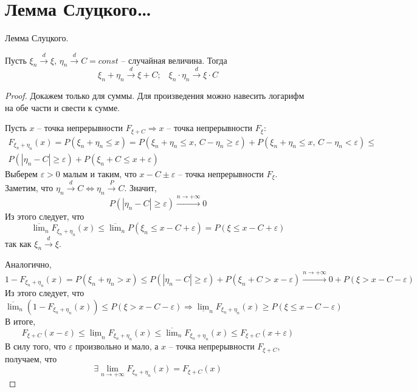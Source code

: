 \section{Лемма Слуцкого\dots}
\begin{theorem}
	Лемма Слуцкого.

	Пусть $\xi_n \stackrel{d}{\to} \xi,\, \eta_n \stackrel{d}{\to} C = const$ -- случайная величина. Тогда
	\[\xi_n + \eta_n \stackrel{d}{\to} \xi + C;\;\;\; \xi_n\cdot\eta_n \stackrel{d}{\to} \xi\cdot C\]
\end{theorem}

\begin{proof}
	Докажем только для суммы. Для произведения можно навесить логарифм на обе части и свести к сумме.

	Пусть $x$ -- точка непрерывности $F_{\xi + C} \Rightarrow x$ -- точка непрерывности $F_\xi$:
	\begin{align*}
		F_{\xi_n + \eta_n}(x) = P(\xi_n + \eta_n \leq x) = P(\xi_n + \eta_n \leq x,\, C - \eta_n \geq \varepsilon) + P(\xi_n + \eta_n \leq x,\, C - \eta_n < \varepsilon) \leq \\
		P(|\eta_n - C| \geq \varepsilon) + P(\xi_n + C \leq x + \varepsilon)
	\end{align*}
	Выберем $\varepsilon > 0$ малым и таким, что $x - C \pm \varepsilon$ -- точка непрерывности $F_\xi$. Заметим, что $\eta_n \stackrel{d}{\to} C \Leftrightarrow \eta_n \stackrel{P}{\to} C$. Значит,
	\[P(|\eta_n - C| \geq \varepsilon) \stackrel{n \to +\infty}{\to} 0\]
	Из этого следует, что
	\[\overline{\lim}_n F_{\xi_n + \eta_n}(x) \leq \overline{\lim}_n P(\xi_n \leq x - C + \varepsilon) = P(\xi \leq x - C + \varepsilon)\]
	так как $\xi_n \stackrel{d}{\to} \xi$.

	Аналогично,
	\[1 - F_{\xi_n + \eta_n}(x) = P(\xi_n + \eta_n > x) \leq P(|\eta_n - C| \geq \varepsilon) + P(\xi_n + C > x - \varepsilon) \stackrel{n \to +\infty}{\to} 0 + P(\xi > x - C - \varepsilon)\]
	Из этого следует, что
	\[\overline{\lim}_n(1 - F_{\xi_n + \eta_n}(x)) \leq P(\xi > x - C - \varepsilon) \Rightarrow \underline{\lim}_n F_{\xi_n + \eta_n}(x) \geq P(\xi \leq x - C - \varepsilon)\]
	В итоге,
	\[F_{\xi + C}(x - \varepsilon) \leq \underline{\lim}_nF_{\xi_n + \eta_n}(x) \leq \overline{\lim}_n F_{\xi_n + \eta_n}(x) \leq F_{\xi + C}(x + \varepsilon)\]
	В силу того, что $\varepsilon$ произвольно и мало, а $x$ -- точка непрерывности $F_{\xi + C}$, получаем, что
	\[\exists \lim_{n \to +\infty}F_{\xi_n + \eta_n}(x) = F_{\xi + C}(x)\]
\end{proof}

